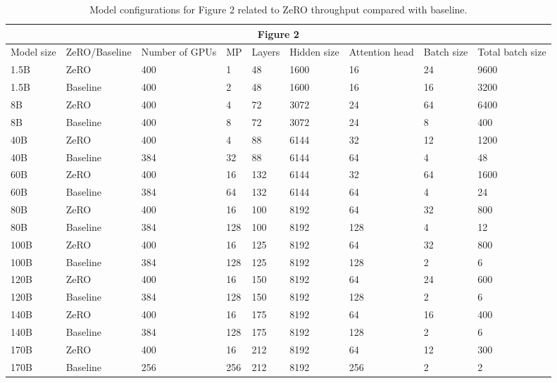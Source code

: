 
\begin{table}[t!]
\scriptsize
\begin{tabular}{|l|l|l|l|l|l|l|l|l|}
\hline
\multicolumn{9}{|c|}{Figure 2} \\ \hline
Model size & ZeRO/Baseline & Number of GPUs & MP & Layers & Hidden size & Attention head & Batch size & Total batch size \\ \hline
1.5B & ZeRO & 400 & 1 & 48 & 1600 & 16 & 24 & 9600 \\ \hline
1.5B & Baseline & 400 & 2 & 48 & 1600 & 16 & 16 & 3200 \\ \hline
8B & ZeRO & 400 & 4 & 72 & 3072 & 24 & 64 & 6400 \\ \hline
8B & Baseline & 400 & 8 & 72 & 3072 & 24 & 8 & 400 \\ \hline
40B & ZeRO & 400 & 4 & 88 & 6144 & 32 & 12 & 1200 \\ \hline
40B & Baseline & 384 & 32 & 88 & 6144 & 64 & 4 & 48 \\ \hline
60B & ZeRO & 400 & 16 & 132 & 6144 & 32 & 64 & 1600 \\ \hline
60B & Baseline & 384 & 64 & 132 & 6144 & 64 & 4 & 24 \\ \hline
80B & ZeRO & 400 & 16 & 100 & 8192 & 64 & 32 & 800 \\ \hline
80B & Baseline & 384 & 128 & 100 & 8192 & 128 & 4 & 12 \\ \hline
100B & ZeRO & 400 & 16 & 125 & 8192 & 64 & 32 & 800 \\ \hline
100B & Baseline & 384 & 128 & 125 & 8192 & 128 & 2 & 6 \\ \hline
120B & ZeRO & 400 & 16 & 150 & 8192 & 64 & 24 & 600 \\ \hline
120B & Baseline & 384 & 128 & 150 & 8192 & 128 & 2 & 6 \\ \hline
140B & ZeRO & 400 & 16 & 175 & 8192 & 64 & 16 & 400 \\ \hline
140B & Baseline & 384 & 128 & 175 & 8192 & 128 & 2 & 6 \\ \hline
170B & ZeRO & 400 & 16 & 212 & 8192 & 64 & 12 & 300 \\ \hline
170B & Baseline & 256 & 256 & 212 & 8192 & 256 & 2 & 2 \\ \hline
\end{tabular}
\caption{Model configurations for Figure 2 related to ZeRO throughput compared with baseline.} \label{tab:fig2-tab}
\end{table}

